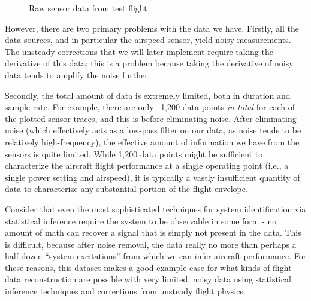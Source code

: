 \documentclass[conf]{new-aiaa}
\begin{document}
    \begin{figure}[!htb]
        \centering
        \caption{Raw sensor data from test flight}
        \label{fig:raw_flight_data}
    \end{figure}


    However, there are two primary problems with the data we have. Firstly, all the data sources, and in particular the airspeed sensor, yield noisy measurements. The unsteady corrections that we will later implement require taking the derivative of this data; this is a problem because taking the derivative of noisy data tends to amplify the noise further.

    Secondly, the total amount of data is extremely limited, both in duration and sample rate. For example, there are only ~1,200 data points \emph{in total} for each of the plotted sensor traces, and this is before eliminating noise. After eliminating noise (which effectively acts as a low-pass filter on our data, as noise tends to be relatively high-frequency), the effective amount of information we have from the sensors is quite limited. While 1,200 data points might be sufficient to characterize the aircraft flight performance at a single operating point (i.e., a single power setting and airspeed), it is typically a vastly insufficient quantity of data to characterize any substantial portion of the flight envelope.

    Consider that even the most sophisticated techniques for system identification via statistical inference require the system to be observable in some form - no amount of math can recover a signal that is simply not present in the data. This is difficult, because after noise removal, the data really no more than perhaps a half-dozen ``system excitations'' from which we can infer aircraft performance. For these reasons, this dataset makes a good example case for what kinds of flight data reconstruction are possible with very limited, noisy data using statistical inference techniques and corrections from unsteady flight physics.
\end{document}
